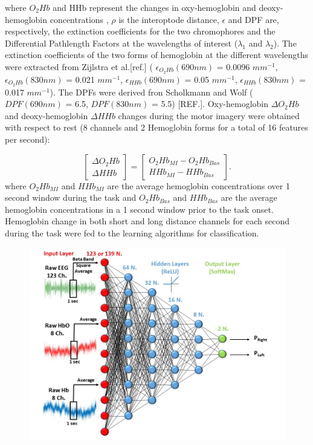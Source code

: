 \documentclass[12pt ]{iopart}
\begin{document}
where $O_{2}Hb$ and HHb represent the changes in oxy-hemoglobin and deoxy-hemoglobin concentrations , $\rho$ is the interoptode distance, $\epsilon$  and DPF are, respectively, the extinction coefficients for the two chromophores and the Differential Pathlength Factors at the wavelengths of interest ($\lambda _{1}$ and $\lambda _{2}$). The extinction coefficients of the two forms of hemoglobin at the different wavelengths  were extracted from Zijlstra et al.[ref.] ( $\epsilon_{O_{2}Hb}(690nm)$ = 0.0096 $mm^{-1}$, $\epsilon_{O_{2}Hb}(830nm)$ = 0.021 $mm^{-1}$, $\epsilon_{HHb}(690nm)$ = 0.05 $mm^{-1}$, $\epsilon_{HHb}(830nm)$ = 0.017 $mm^{-1}$).  The DPFs were derived fron Scholkmann and Wolf  ( $DPF(690nm)$ = 6.5, $DPF(830nm)$ = 5.5) [REF.].
Oxy-hemoglobin $\Delta O_{2}Hb$ and deoxy-hemoglobin $\Delta HHb$ changes during the motor imagery were obtained  with respect to rest (8 channels and 2 Hemoglobin forms for a total of 16 features per second):

 

\begin{equation}
\begin{bmatrix}
\Delta O_2Hb\\
\Delta HHb
\end{bmatrix}
=
\begin{bmatrix}
O_2Hb_{MI}-O_2Hb_{Bas}\\
HHb_{MI}-HHb_{Bas}
\end{bmatrix}
.
\end{equation}
where $O_{2}Hb_{MI}$ and $HHb_{MI}$ are the average hemoglobin concentrations over 1 second window during the task and $O_{2}Hb_{Bas}$ and $HHb_{Bas}$ are the average hemoglobin concentrations in a 1 second window prior to the task onset.
Hemoglobin change  in both short and long distance channels for each second during the task were fed to the learning algorithms for classification. 

\begin{figure}
	\includegraphics[width=\linewidth]{Slide3.JPG}
	\caption{}
	\label{fig:fig3}
\end{figure}
\end{document}
